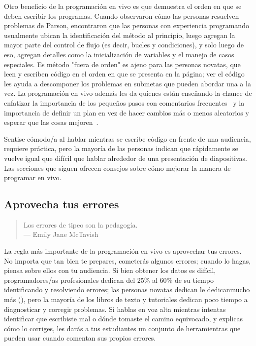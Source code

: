 Otro beneficio de la programación en vivo es que demuestra el orden en que se deben escribir los programas.
Cuando observaron cómo las personas resuelven problemas de Parson,
\cite{Ihan2011} encontraron que las personas con experiencia programando usualmente ubican la identificación del método al principio,
luego agregan la mayor parte del control de flujo (es decir, bucles y condiciones),
y solo luego de eso, agregan detalles como la inicialización de variables y el manejo de casos especiales.
Es método "fuera de orden" es ajeno para las personas novatas,
que leen y escriben código en el orden en que se presenta en la página;
ver el código les ayuda a descomponer los problemas en submetas que pueden abordar una a la vez.
La programación en vivo además les da quienes están enseñando la chance de enfatizar la importancia de los pequeños pasos con comentarios frecuentes~\cite{Blik2014}
y la importancia de definir un plan en vez de hacer 
cambios más o menos aleatorios y esperar que las cosas mejoren~\cite{Spoh1985}.

Sentise cómodo/a al hablar mientras se escribe código en 
frente de una audiencia, requiere práctica,
pero la mayoría de las personas indican que rápidamente se vuelve igual que difícil que hablar alrededor de una presentación de diapositivas.
Las secciones que siguen ofrecen consejos sobre cómo mejorar la manera de programar en vivo.

\subsection*{Aprovecha tus errores}

\begin{quote}

  Los errores de tipeo son la pedagogía. \\
  --- Emily Jane McTavish

\end{quote}

La regla más importante de la programación en vivo es aprovechar tus errores.
No importa que tan bien te prepares, 
cometerás algunos errores;
cuando lo hagas,
piensa sobre ellos con tu audiencia.
Si bien obtener los datos es difícil,
programadores/as profesionales dedican del 25\% al 60\% de su tiempo identificando y resolviendo errores;
las personas novatas dedican le dedicanmucho más (),
pero la mayoría de los libros de texto y tutoriales dedican poco tiempo a diagnosticar y corregir problemas.
Si hablas en voz alta mientras intentas identificar que escribiste mal
o dónde tomaste el camino equivocado,
y explicas cómo lo corriges,
les darás a tus estudiantes un conjunto de herramientras que pueden usar cuando comentan sus propios errores.

